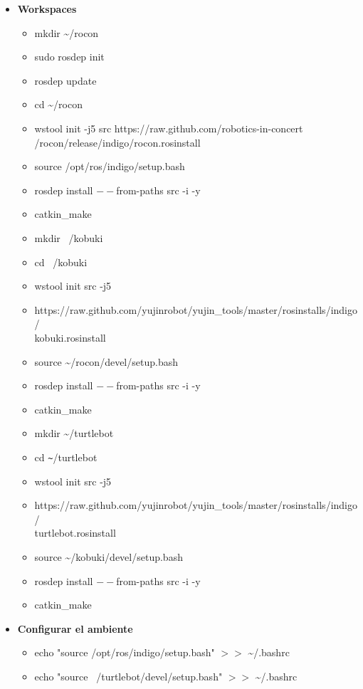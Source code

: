\documentclass[12pt,a4paper]{article}
\begin{document}
\begin{itemize}
\item {\textbf{Workspaces}}
\begin{itemize}
\item mkdir \textasciitilde/rocon
\item sudo rosdep init
\item rosdep update
\item cd \textasciitilde/rocon \item wstool init -j5 src https://raw.github.com/robotics-in-concert\\/rocon/release/indigo/rocon.rosinstall
\item source /opt/ros/indigo/setup.bash
\item rosdep install $--$from-paths src -i -y
\item catkin\_make\\
\item mkdir ~/kobuki
\item cd ~/kobuki
\item wstool init src -j5  \item https://raw.github.com/yujinrobot/yujin\_tools/master/rosinstalls/indigo/\\kobuki.rosinstall
\item source \textasciitilde/rocon/devel/setup.bash
\item rosdep install $--$from-paths src -i -y
\item catkin\_make\\
\item mkdir \textasciitilde/turtlebot
\item cd \verb'~'/turtlebot
\item wstool init src -j5 \item https://raw.github.com/yujinrobot/yujin\_tools/master/rosinstalls/indigo/\\turtlebot.rosinstall
\item source \textasciitilde/kobuki/devel/setup.bash
\item rosdep install $--$from-paths src -i -y
\item catkin\_make
\end{itemize}

\item \textbf{Configurar el ambiente}

\begin{itemize}
\item echo "source /opt/ros/indigo/setup.bash" $>>$ \textasciitilde/.bashrc
\item echo "source ~/turtlebot/devel/setup.bash" $>>$ \textasciitilde/.bashrc
\end{itemize}
\end{itemize}
\end{document}
